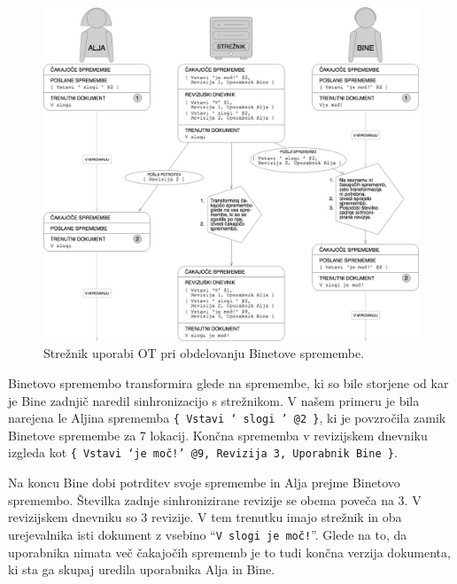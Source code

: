 \documentclass[a4paper, 12pt, twoside]{book}
\begin{document}
\begin{figure}[placement h]
\begin{center}
\includegraphics[width=14cm]{pc5.png}
\end{center}
\caption{Strežnik uporabi OT pri obdelovanju Binetove spremembe.}
\label{pc5}
\end{figure}

Binetovo spremembo transformira glede na spremembe, ki so bile storjene od kar je Bine zadnjič naredil sinhronizacijo s strežnikom. V našem primeru je bila narejena le Aljina sprememba {\tt \{ Vstavi ‘ slogi ’ @2 \}}, ki je povzročila zamik Binetove spremembe za 7 lokacij. Končna sprememba v revizijskem dnevniku izgleda kot {\tt \{ Vstavi ‘je moč!’ @9, Revizija 3, Uporabnik Bine \}}.

\pagebreak

Na koncu Bine dobi potrditev svoje spremembe in Alja prejme Binetovo spremembo. Številka zadnje sinhronizirane revizije se obema poveča na 3. V revizijskem dnevniku so 3 revizije. V tem trenutku imajo strežnik in oba urejevalnika isti dokument z vsebino “{\tt V slogi je moč!}”. Glede na to, da uporabnika nimata več čakajočih sprememb je to tudi končna verzija dokumenta, ki sta ga skupaj uredila uporabnika Alja in Bine.
\end{document}
